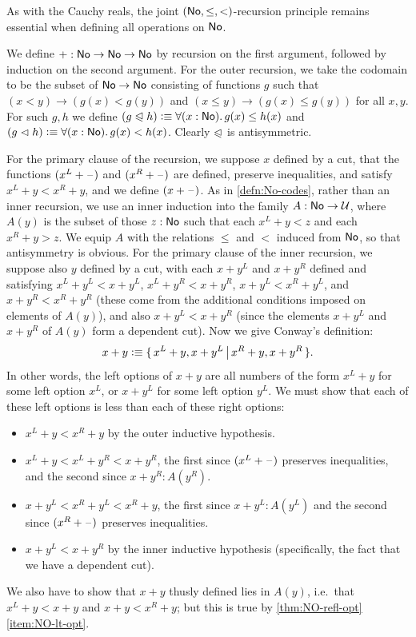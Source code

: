 As with the Cauchy reals, the joint $(\mathsf{No},\le,<)$-recursion principle remains essential when defining all operations on $\mathsf{No}$.

\begin{eg}\label{eg:surreal-addition}
%
We define $\mathord+:\mathsf{No}\to\mathsf{No}\to\mathsf{No}$ by recursion on the first argument, followed by induction on the second argument.
For the outer recursion, we take the codomain to be the subset of $\mathsf{No}\to\mathsf{No}$ consisting of functions $g$ such that $(x<y) \to (g(x)<g(y))$ and $(x\le y) \to (g(x)\le g(y))$ for all $x,y$.
For such $g,h$ we define $(g\ble h)\defeq \fall{x:\NO} g(x)\le h(x)$ and $(g\blt h)\defeq \fall{x:\NO} g(x)< h(x)$.
Clearly $\trianglelefteqslant$ is antisymmetric.

For the primary clause of the recursion, we suppose $x$ defined by a cut, that the functions $(x^L+\mathord{\hspace{1pt}\text{--}\hspace{1pt}})$ and $(x^R+\mathord{\hspace{1pt}\text{--}\hspace{1pt}})$ are defined, preserve inequalities, and satisfy $x^L+y<x^R+y$, and we define $(x+\mathord{\hspace{1pt}\text{--}\hspace{1pt}})$.
As in \cref{defn:No-codes}, rather than an inner recursion, we use an inner induction into the family $A:\mathsf{No}\to\mathcal{U}$, where $A(y)$ is the subset of those $z:\mathsf{No}$ such that each $x^L + y < z$ and each $x^R + y > z$.
We equip $A$ with the relations $\le$ and $<$ induced from $\mathsf{No}$, so that antisymmetry is obvious.
For the primary clause of the inner recursion, we suppose also $y$ defined by a cut, with each $x+y^L$ and $x+y^R$ defined and satisfying $x^L+y^L < x+y^L$, $x^L+y^R < x+y^R$, $x+y^L < x^R + y^L$, and $x+y^R < x^R+y^R$ (these come from the additional conditions imposed on elements of $A(y)$), and also $x+y^L < x+y^R$ (since the elements $x+y^L$ and $x+y^R$ of $A(y)$ form a dependent cut).
Now we give Conway's definition:
\[ x+y \vcentcolon\equiv \{\,x^L+y, x+y^L\,\big|\,x^R+y,x+y^R\,\}. \]
In other words, the left options of $x+y$ are all numbers of the form $x^L+y$ for some left option $x^L$, or $x+y^L$ for some left option $y^L$.
We must show that each of these left options is less than each of these right options:
\begin{itemize}
\item $x^L+y < x^R+y$ by the outer inductive hypothesis.
\item $x^L+y < x^L + y^R < x + y^R$, the first since $(x^L+\mathord{\hspace{1pt}\text{--}\hspace{1pt}})$ preserves inequalities, and the second since $x+y^R : A(y^R)$.
\item $x+y^L < x^R+ y^L < x^R + y$, the first since $x+y^L : A(y^L)$ and the second since $(x^R+\mathord{\hspace{1pt}\text{--}\hspace{1pt}})$ preserves inequalities.
\item $x+y^L < x+y^R$ by the inner inductive hypothesis (specifically, the fact that we have a dependent cut).
\end{itemize}
We also have to show that $x+y$ thusly defined lies in $A(y)$, i.e.\ that $x^L + y < x+y$ and $x+y < x^R + y$; but this is true by \cref{thm:NO-refl-opt}\ref{item:NO-lt-opt}.


\end{eg}
